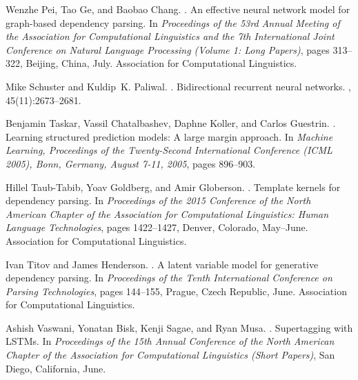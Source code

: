 \documentclass[11pt]{article}
\begin{document}
\begin{thebibliography}{}
Wenzhe Pei, Tao Ge, and Baobao Chang.
.
\newblock An effective neural network model for graph-based dependency parsing.
\newblock In {\em Proceedings of the 53rd Annual Meeting of the Association for
  Computational Linguistics and the 7th International Joint Conference on
  Natural Language Processing (Volume 1: Long Papers)}, pages 313--322,
  Beijing, China, July. Association for Computational Linguistics.

Mike Schuster and Kuldip~K. Paliwal.
.
\newblock Bidirectional recurrent neural networks.
, 45(11):2673--2681.

Benjamin Taskar, Vassil Chatalbashev, Daphne Koller, and Carlos Guestrin.
.
\newblock Learning structured prediction models: A large margin approach.
\newblock In {\em Machine Learning, Proceedings of the Twenty-Second
  International Conference {(ICML} 2005), Bonn, Germany, August 7-11, 2005},
  pages 896--903.

Hillel Taub-Tabib, Yoav Goldberg, and Amir Globerson.
.
\newblock Template kernels for dependency parsing.
\newblock In {\em Proceedings of the 2015 Conference of the North American
  Chapter of the Association for Computational Linguistics: Human Language
  Technologies}, pages 1422--1427, Denver, Colorado, May--June. Association for
  Computational Linguistics.

Ivan Titov and James Henderson.
.
\newblock A latent variable model for generative dependency parsing.
\newblock In {\em Proceedings of the Tenth International Conference on Parsing
  Technologies}, pages 144--155, Prague, Czech Republic, June. Association for
  Computational Linguistics.

Ashish Vaswani, Yonatan Bisk, Kenji Sagae, and Ryan Musa.
.
\newblock Supertagging with {LSTMs}.
\newblock In {\em Proceedings of the 15th Annual Conference of the North
  American Chapter of the Association for Computational Linguistics (Short
  Papers)}, San Diego, California, June.


\end{thebibliography}
\end{document}
